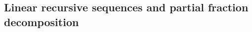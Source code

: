 

\setcounter{section}{2}
\setcounter{subsection}{3}
\setcounter{dfn}{7}

\subsection{Linear recursive sequences and partial fraction decomposition}

